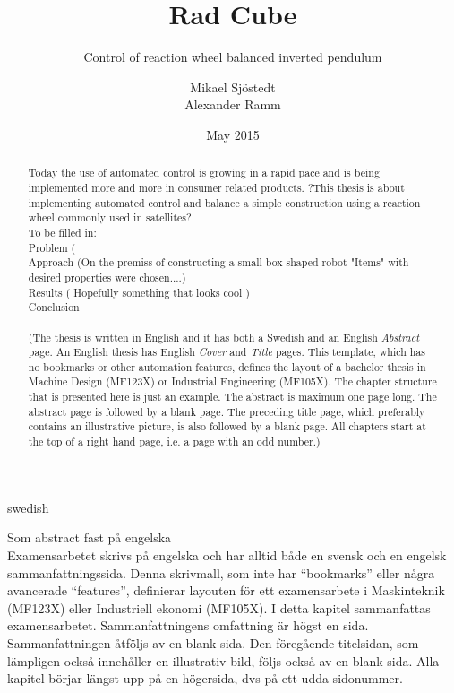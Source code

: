 \documentclass[a4paper,11pt]{kth-mag}
\title{Rad Cube}
\subtitle{Control of reaction wheel balanced inverted pendulum}
\author{Mikael Sjöstedt \\ Alexander Ramm}
\date{May 2015}
\begin{document}
%
\clearpage

\frontmatter
\pagestyle{plain}
{}
\maketitle
{}
\begin{abstract}
Today the use of automated control is growing in a rapid pace and is being implemented more and more in consumer related products. ?This thesis is about implementing automated control and balance a simple construction using a reaction wheel commonly used in satellites? 
\\ To be filled in:
\\Problem ( 
\\Approach (On the premiss of constructing a small box shaped robot "Items" with desired properties were chosen....)
\\Results ( Hopefully something that looks cool ) 
\\ Conclusion
\\ \\
(The thesis is written in English and it has both a Swedish and an English \textit{Abstract} page. An English thesis has English \textit{Cover} and \textit{Title} pages. This template, which has no bookmarks or other automation features, defines the layout of a bachelor thesis in Machine Design (MF123X) or Industrial Engineering (MF105X).  The chapter structure that is presented here is just an example.
The abstract is maximum one page long. The abstract page is followed by a blank page. The preceding title page, which preferably contains an illustrative picture, is also followed by a blank page. All chapters start at the top of a right hand page, i.e. a page with an odd number.)
\end{abstract}
\cleardoublepage
\begin{foreignabstract}{swedish}
Som abstract fast på engelska
\\
Examensarbetet skrivs på engelska och har alltid både en svensk och en engelsk sammanfattningssida. Denna skrivmall, som inte har ``bookmarks'' eller några avancerade ``features'', definierar layouten för ett examensarbete i Maskinteknik (MF123X) eller Industriell ekonomi (MF105X).
I detta kapitel sammanfattas examensarbetet. Sammanfattningens omfattning är högst en sida. Sammanfattningen åtföljs av en blank sida. Den föregående titelsidan, som lämpligen också innehåller en illustrativ bild, följs också av en blank sida. Alla kapitel börjar längst upp på en högersida, dvs på ett udda sidonummer.
\end{foreignabstract}
\clearpage
\end{document}

